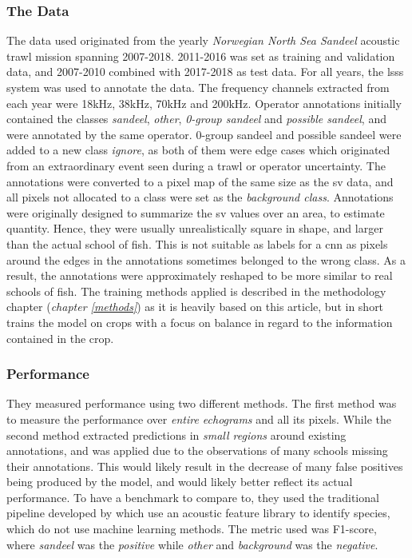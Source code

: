     \subsubsection{The Data}
    The data used originated from the yearly \textit{Norwegian North Sea Sandeel} acoustic trawl mission spanning 2007-2018. 2011-2016 was set as training and validation data, and 2007-2010 combined with 2017-2018 as test data. For all years, the \gls{lsss} system was used to annotate the data. The frequency channels extracted from each year were 18kHz, 38kHz, 70kHz and 200kHz. Operator annotations initially contained the classes \textit{sandeel}, \textit{other}, \textit{0-group sandeel} and \textit{possible sandeel}, and were annotated by the same operator. 0-group sandeel and possible sandeel were added to a new class \textit{ignore}, as both of them were edge cases which originated from an extraordinary event seen during a trawl or operator uncertainty. The annotations were converted to a pixel map of the same size as the \gls{sv} data, and all pixels not allocated to a class were set as the \textit{background class}. Annotations were originally designed to summarize the \gls{sv} values over an area, to estimate quantity. Hence, they were usually unrealistically square in shape, and larger than the actual school of fish. This is not suitable as labels for a \gls{cnn} as pixels around the edges in the annotations sometimes belonged to the wrong class. As a result, the annotations were approximately reshaped to be more similar to real schools of fish. The training methods applied is described in the methodology chapter (\textit{chapter \ref{methods}}) as it is heavily based on this article\cite{brautaset2020acoustic}, but in short trains the model on crops with a focus on balance in regard to the information contained in the crop.
    
    \subsubsection{Performance}
    They measured performance using two different methods\cite{brautaset2020acoustic}. The first method was to measure the performance over \textit{entire echograms} and all its pixels. While the second method extracted predictions in \textit{small regions} around existing annotations, and was applied due to  the observations of many schools missing their annotations. This would likely result in the decrease of many false positives being produced by the model, and would likely better reflect its actual performance. To have a benchmark to compare to, they used the traditional pipeline developed by \citet{korneliussen2016acoustic} which use an acoustic feature library to identify species, which do not use machine learning methods. The metric used was F1-score, where \textit{sandeel} was the \textit{positive}   while \textit{other} and \textit{background} was the \textit{negative}. 
    
